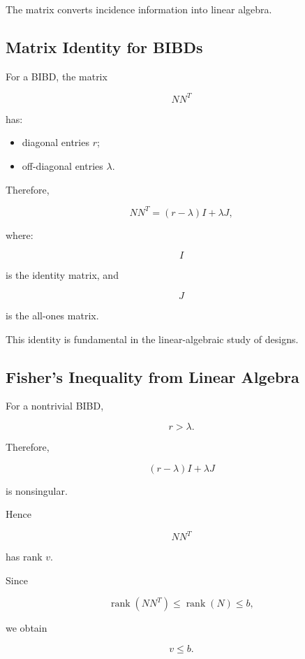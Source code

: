 The matrix converts incidence information into linear algebra.

\subsection{Matrix Identity for BIBDs}
\label{subsec:bibd-matrix-identity}

For a BIBD, the matrix

\[
NN^T
\]

has:

\begin{itemize}
    \item diagonal entries \(r\);
    \item off-diagonal entries \(\lambda\).
\end{itemize}

Therefore,

\[
\boxed{
NN^T
=
(r-\lambda)I
+
\lambda J,
}
\]

where:

\[
I
\]

is the identity matrix, and

\[
J
\]

is the all-ones matrix.

This identity is fundamental in the linear-algebraic study of designs.

\subsection{Fisher's Inequality from Linear Algebra}
\label{subsec:fisher-linear-algebra}

For a nontrivial BIBD,

\[
r>\lambda.
\]

Therefore,

\[
(r-\lambda)I+\lambda J
\]

is nonsingular.

Hence

\[
NN^T
\]

has rank \(v\).

Since

\[
\operatorname{rank}(NN^T)
\leq
\operatorname{rank}(N)
\leq
b,
\]

we obtain

\[
v\leq b.
\]

